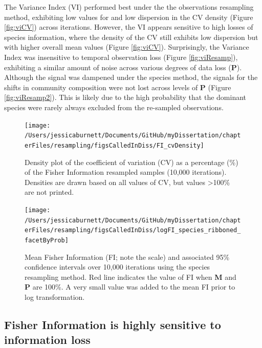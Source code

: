 \documentclass[12pt,twoside,openany]{reedthesis}
\begin{document}
The Variance Index (VI) performed best under the the observations resampling method, exhibiting low values for and low dispersion in the CV density (Figure \ref{fig:viCV}) across iterations. However, the VI appears sensitive to high losses of species information, where the density of the CV still exhibits low dispersion but with higher overall mean values (Figure \ref{fig:viCV}). Surprisingly, the Variance Index was insensitive to temporal observation loss (Figure \ref{fig:viResamp}), exhibiting a similar amount of noise across various degrees of data loss (\(\textbf{P}\)). Although the signal was dampened under the species method, the signals for the shifts in community composition were not lost across levels of \(\textbf{P}\) (Figure \ref{fig:viResamp2}). This is likely due to the high probability that the dominant species were rarely always excluded from the re-sampled observations.

\begin{figure}[bth]

{\centering \texttt{[image: /Users/jessicaburnett/Documents/GitHub/myDissertation/chapterFiles/resampling/figsCalledInDiss/FI\_cvDensity]} 

}

\caption{Density plot of the coefficient of variation (CV) as a percentage (\%) of the Fisher Information resampled samples (10,000 iterations). Densities are drawn based on all values of CV, but values \textgreater100\% are not printed.}\label{fig:fiCV}
\end{figure}

\begin{figure}[bth]

{\centering \texttt{[image: /Users/jessicaburnett/Documents/GitHub/myDissertation/chapterFiles/resampling/figsCalledInDiss/logFI\_species\_ribboned\_facetByProb]} 

}

\caption{Mean Fisher Information (FI; note the scale) and associated 95\% confidence intervals over 10,000 iterations using the species resampling method. Red line indicates the value of FI when \textbf{M} and \textbf{P} are 100\%. A very small value was added to the mean FI prior to log transformation.}\label{fig:fiResamp}
\end{figure}
\hypertarget{fisher-information-is-highly-sensitive-to-information-loss}{%
\subsection{Fisher Information is highly sensitive to information loss}\label{fisher-information-is-highly-sensitive-to-information-loss}}
\end{document}
